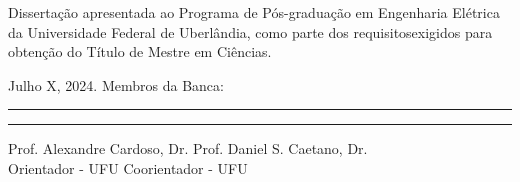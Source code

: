 
\newpage
\thispagestyle{empty}   %
\begin{center}
\ABNTEXchapterfont\large\imprimirautor
\vskip 4cm
\ABNTEXchapterfont\bfseries\Large\imprimirtitulo
\end{center}
\vskip 2cm


\hfill                                                         %
\begin{minipage}{11cm}
Dissertação apresentada ao Programa de Pós-graduação em Engenharia Elétrica da Universidade Federal de Uberlândia, como parte dos requisitosexigidos para obtenção do Título de Mestre em Ciências.

\end{minipage}
\vskip 0.5cm
\noindent  Julho X,  2024.
\vskip 0.5cm
\noindent Membros da Banca:
\vskip 1cm
\begin{flushleft}
\rule{7cm}{0.4mm}
\hskip 36pt
\rule{7.3cm}{0.4mm}
\end{flushleft}
\vspace{-0.5cm}
Prof. Alexandre Cardoso, Dr. \hskip 2.94cm Prof. Daniel S. Caetano, Dr.\\
Orientador - UFU \hskip 5cm Coorientador - UFU \\
